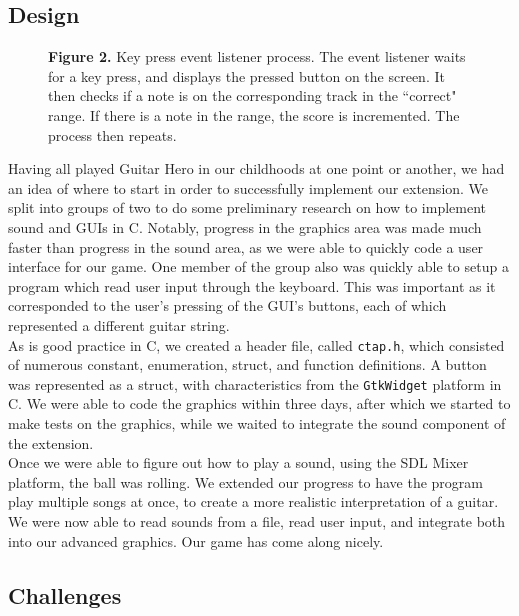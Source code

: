 \documentclass[11pt]{article}
\begin{document}
\subsection{Design}

\begin{wrapfigure}{R}{10em}
  \raggedleft
  
  \captionsetup{justification=justified,singlelinecheck=false}
  \caption*{\fontsize{9}{9}\selectfont \textbf{Figure 2.} Key press event listener process. The event listener waits for a key press, and displays the pressed button on the screen. It then checks if a note is on the corresponding track in the ``correct" range. If there is a note in the range, the score is incremented. The process then repeats.}
\end{wrapfigure}



Having all played Guitar Hero in our childhoods at one point or another, we had an idea of where to start in order to successfully implement our extension. We split into groups of two to do some preliminary research on how to implement sound and GUIs in C. Notably, progress in the graphics area was made much faster than progress in the sound area, as we were able to quickly code a user interface for our game. One member of the group also was quickly able to setup a program which read user input through the keyboard. This was important as it corresponded to the user's pressing of the GUI's buttons, each of which represented a different guitar string.
\\ \hspace{10mm} As is good practice in C, we created a header file, called \texttt{ctap.h}, which consisted of numerous constant, enumeration, struct, and function definitions. A button was represented as a struct, with characteristics from the \texttt{GtkWidget} platform in C. We were able to code the graphics within three days, after which we started to make tests on the graphics, while we waited to integrate the sound component of the extension.
\\ \hspace{10mm} Once we were able to figure out how to play a sound, using the SDL Mixer platform, the ball was rolling. We extended our progress to have the program play multiple songs at once, to create a more realistic interpretation of a guitar. We were now able to read sounds from a file, read user input, and integrate both into our advanced graphics. Our game has come along nicely.

\subsection{Challenges}
\end{document}
